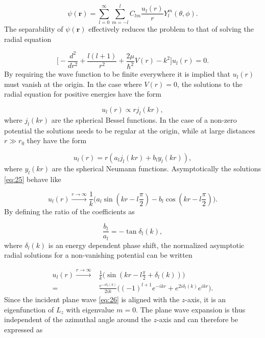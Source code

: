 \documentclass{article}
\numberwithin{equation}{section}
\numberwithin{figure}{section}
\begin{document}
\begin{equation}\label{eq:32}
\psi(\mathbf{r}) = \sum_{l=0}^{\infty} \sum_{m = -l}^{l} C_{lm}\frac{u_{l}(r)}{r}Y_l^m(\theta,\phi).
\end{equation}
The separability of $\psi(\mathbf{r})$ effectively reduces the problem to that of solving the radial equation

\begin{equation} \label{eq:24}
\bigg[-\frac{d^2}{dr^2} + \frac{l(l+1)}{r^2} + \frac{2\mu}{\hbar^2}V(r) - k^2\bigg]u_l(r) = 0.
\end{equation}
By requiring the wave function to be finite  everywhere it is implied that $u_l(r)$ must vanish at the origin. In the case where $V(r) = 0$, the solutions to the radial equation for positive energies have the form

\begin{equation}\label{eq:zero}
u_l(r) \propto r j_l(kr),
\end{equation}
where $j_l(kr)$ are the spherical Bessel functions. In the case of a non-zero potential the solutions needs to be regular at the origin, while at large distances $r \gg r_0$ they have the form

\begin{equation}\label{eq:25}
u_l(r) = r(a_l j_l(kr)+b_l y_l(kr)),
\end{equation} 
where $y_l(kr)$ are the spherical Neumann functions. Asymptotically the solutions \eqref{eq:25} behave like

\begin{equation}
u_l(r) \xrightarrow{r\to\infty} \frac{1}{k}\big(a_l \sin(kr - l\frac{\pi}{2})-b_l \cos(kr - l\frac{\pi}{2})\big).
\end{equation} 
By defining the ratio of the coefficients as

\begin{equation}\label{eq:tan}
\frac{b_l}{a_l} = -\tan\delta_l(k),
\end{equation} 
where $\delta_l(k)$ is an energy dependent phase shift, the normalized asymptotic radial solutions for a non-vanishing potential can be written

\begin{equation}\label{eq:assympt}
\begin{split}
u_l(r) \xrightarrow{r \to \infty} &\frac{1}{k}\big(\sin(kr - l\frac{\pi}{2} + \delta_l(k))\big)\\
=&\frac{e^{-i\delta_l(k)}}{2ik}\big((-1)^{l+1}e^{-ikr} + e^{2i\delta_l(k)}e^{ikr}\big).
\end{split}
\end{equation}
Since the incident plane wave \eqref{eq:26} is aligned with the $z$-axis, it is an eigenfunction of $L_z$ with eigenvalue $m=0$. The plane wave expansion is thus independent of the azimuthal angle around the $z$-axis and can therefore be expressed as
\end{document}
